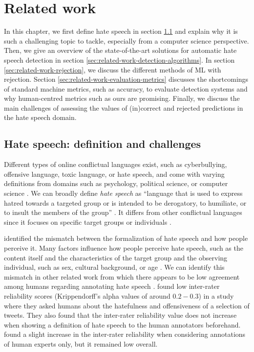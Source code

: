 \chapter{Related work}
\label{sec:related-work}
In this chapter, we first define hate speech in section \ref{sec:related-work-challenges} and explain why it is such a challenging topic to tackle, especially from a computer science perspective.
%
Then, we give an overview of the state-of-the-art solutions for automatic hate speech detection in section \ref{sec:related-work-detection-algorithms}.
%
In section \ref{sec:related-work-rejection}, we discuss the different methods of ML with rejection.
%
Section \ref{sec:related-work-evaluation-metrics} discusses the shortcomings of standard machine metrics, such as accuracy, to evaluate detection systems and why human-centred metrics such as ours are promising.
%
Finally, we discuss the main challenges of assessing the values of (in)correct and rejected predictions in the hate speech domain.
%

\section{Hate speech: definition and challenges}
\label{sec:related-work-challenges}
Different types of online conflictual languages exist, such as cyberbullying, offensive language, toxic language, or hate speech, and come with varying definitions from domains such as psychology, political science, or computer science \citep{balayn2021automatic}.
%
We can broadly define \textit{hate speech} as ``language that is used to express hatred towards a targeted group or is intended to be derogatory, to humiliate, or to insult the members of the group'' \citep{davidson2017automated, balayn2021automatic}.
%
It differs from other conflictual languages since it focuses on specific target groups or individuals \citep{balayn2021automatic}.
%
%

%
\citet{balayn2021automatic} identified the mismatch between the formalization of hate speech and how people perceive it.
%
Many factors influence how people perceive hate speech, such as the content itself and the characteristics of the target group and the observing individual, such as sex, cultural background, or age \citep{balayn2021automatic}.
%
We can identify this mismatch in other related work from which there appears to be low agreement among humans regarding annotating hate speech \citep{fortuna2018survey, ross2017measuring, waseem2016you}.
%
\citet{ross2017measuring} found low inter-rater reliability scores (Krippendorff's alpha values of around $0.2-0.3$) in a study where they asked humans about the hatefulness and offensiveness of a selection of tweets.
%
They also found that the inter-rater reliability value does not increase when showing a definition of hate speech to the human annotators beforehand.
%
\citet{waseem2016you} found a slight increase in the inter-rater reliability when considering annotations of human experts only, but it remained low overall.
%
%

